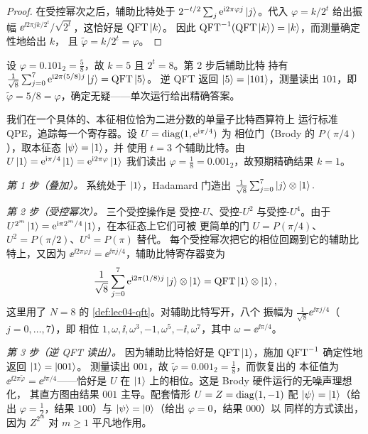 \begin{proof}
在受控幂次之后，辅助比特处于 $2^{-t/2}\sum_j\mathrm{e}^{\mathrm{i} 2\pi\varphi
j}\ket{j}$。代入 $\varphi=k/2^{t}$ 给出振幅
$\ee^{\ii 2\pi jk/2^{t}}/\sqrt{2^{t}}$，这恰好是 $\mathrm{QFT}\ket{k}$。
因此 $\mathrm{QFT}^{-1}(\mathrm{QFT}\ket{k})=\ket{k}$，而测量确定性地给出 $k$，
且 $\tilde\varphi=k/2^{t}=\varphi$。
\end{proof}

\begin{example}[精确情形的算例，$t=3$]
\label{ex-l4:exact}
设 $\varphi=0.101_2=\tfrac58$，故 $k=5$ 且 $2^{t}=8$。第 2 步后辅助比特
持有 $\tfrac{1}{\sqrt8}\sum_{j=0}^{7}\mathrm{e}^{\mathrm{i} 2\pi(5/8)j}\ket{j}=\mathrm{QFT}\ket{5}$。
逆 QFT 返回 $\ket{5}=\ket{101}$，测量读出 $101$，即
$\tilde\varphi=5/8=\varphi$，确定无疑——单次运行给出精确答案。
\end{example}

\begin{example}
\label{exa:lec04-pgate}
我们在一个具体的、本征相位恰为二进分数的单量子比特酉算符上
运行标准 QPE，追踪每一个寄存器。设 $U=\operatorname{diag}(1,\mathrm{e}^{\mathrm{i}\pi/4})$ 为
相位门（Brody 的 $P(\pi/4)$），取本征态 $\ket{\psi}=\ket{1}$，并
使用 $t=3$ 个辅助比特。由 $U\ket{1}=\mathrm{e}^{\mathrm{i}\pi/4}\ket{1}=\mathrm{e}^{\mathrm{i} 2\pi\varphi}
\ket{1}$ 我们读出 $\varphi=\tfrac18=0.001_2$，故预期精确结果
$k=1$。

\emph{第 1 步（叠加）。} 系统处于 $\ket{1}$，Hadamard 门造出
$
  \tfrac{1}{\sqrt8}\sum_{j=0}^{7}\ket{j}\otimes\ket{1}.
$

\emph{第 2 步（受控幂次）。} 三个受控操作是
受控-$U$、受控-$U^{2}$ 与受控-$U^{4}$。由于
$U^{2^{m}}\ket{1}=\mathrm{e}^{\mathrm{i}\pi 2^{m}/4}\ket{1}$，在本征态上它们可被
更简单的门 $U=P(\pi/4)$、$U^{2}=P(\pi/2)$、$U^{4}=P(\pi)$ 替代。
每个受控幂次把它的相位回踢到它的辅助比特上，又因为
$\ee^{\ii 2\pi\varphi j}=\ee^{\ii\pi j/4}$，辅助比特寄存器变为
\[
  \frac{1}{\sqrt8}\sum_{j=0}^{7}\mathrm{e}^{\mathrm{i} 2\pi(1/8)j}\ket{j}\otimes\ket{1}
  =\mathrm{QFT}\ket{1}\otimes\ket{1},
\]
这里用了 $N=8$ 的 \cref{def:lec04-qft}。对辅助比特写开，八个
振幅为 $\tfrac{1}{\sqrt8}\ee^{\ii\pi j/4}$（$j=0,\dots,7$），即
相位 $1,\omega,\ii,\omega^{3},-1,\omega^{5},-\ii,\omega^{7}$，其中
$\omega=\ee^{\ii\pi/4}$。

\emph{第 3 步（逆 QFT 读出）。} 因为辅助比特恰好是
$\mathrm{QFT}\ket{1}$，施加 $\mathrm{QFT}^{-1}$ 确定性地返回 $\ket{1}=\ket{001}$。
测量读出 $001$，故 $\tilde\varphi=0.001_2=\tfrac18$，而恢复出的
本征值为 $\ee^{\ii 2\pi\tilde\varphi}=\ee^{\ii\pi/4}$——恰好是 $U$ 在
$\ket{1}$ 上的相位。这是 Brody 硬件运行的无噪声理想化，
其直方图由结果 $001$ 主导。配套情形
$U=Z=\operatorname{diag}(1,-1)$ 配 $\ket{\psi}=\ket{1}$（给出 $\varphi=\tfrac12$，结果
$100$）与 $\ket{\psi}=\ket{0}$（给出 $\varphi=0$，结果 $000$）以
同样的方式读出，因为 $Z^{2^{m}}$ 对 $m\ge1$ 平凡地作用。
\end{example}

